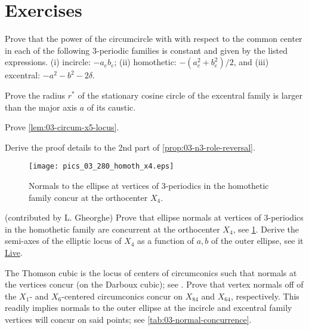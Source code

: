 \section{Exercises}

\begin{exercise}
 \label{ex:03-power-euler} 
Prove that the power of the circumcircle with with respect to the common center in each of the following 3-periodic families is constant and given by the listed expressions. (i) incircle: $-a_e b_e$; (ii) homothetic: $-({a_e^2+b_e^2})/{2}$, and (iii) excentral: $-a^2-b^2-2\delta$. 
\end{exercise}

\begin{exercise}
\label{ex:03-cosine-circle}
Prove the radius $r^*$ of the stationary cosine circle of the excentral family is larger than the major axis $a$ of its caustic. 
\end{exercise}

\begin{exercise}
Prove \cref{lem:03-circum-x5-locus}.
\label{ex:03-circum-x5-locus}
\end{exercise}

\begin{exercise}
Derive the proof details to the 2nd part of \cref{prop:03-n3-role-reversal}.
\end{exercise}

\begin{figure}
    \centering
    \texttt{[image: pics\_03\_280\_homoth\_x4.eps]}
    \caption{Normals to the ellipse at vertices of 3-periodics in the homothetic family concur at the orthocenter $X_4$.}
    \label{fig:03-homoth-x4}
\end{figure}

\begin{exercise}
(contributed by L. Gheorghe) Prove that ellipse normals at vertices of 3-periodics in the homothetic family are concurrent at the orthocenter $X_4$, see \cref{fig:03-homoth-x4}. Derive the semi-axes of the elliptic locus of $X_4$ as a function of $a,b$ of the outer ellipse, see it \href{https://bit.ly/3fpESjh}{Live}.  
\label{ex:03-homoth-x4}
\end{exercise}

\begin{exercise}
The Thomson cubic is the locus of centers of circumconics such that normals at the vertices concur (on the Darboux cubic); see \cite[Darboux and Thomson cubics]{gibert2021-ctc}. Prove that vertex normals off of the $X_1$- and $X_6$-centered circumconics concur on $X_{84}$ and $X_{64}$, respectively. This readily implies normals to the outer ellipse at the incircle and excentral family vertices will concur on said points; see \cref{tab:03-normal-concurrence}. 
\end{exercise}

